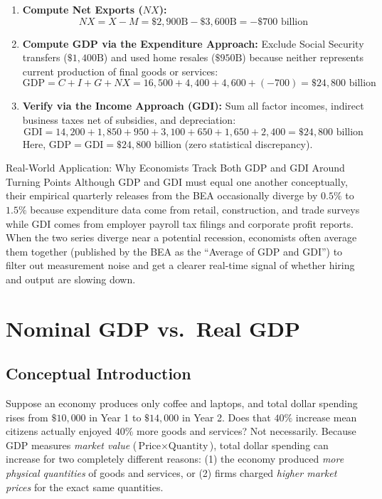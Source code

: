 \documentclass[11pt,letterpaper]{article}
\begin{document}
\begin{enumerate}
    \item \textbf{Compute Net Exports ($NX$):}
    $$NX = X - M = \$2{,}900\text{B} - \$3{,}600\text{B} = -\$700\text{ billion}$$
    \item \textbf{Compute GDP via the Expenditure Approach:}
    Exclude Social Security transfers ($\$1{,}400\text{B}$) and used home resales ($\$950\text{B}$) because neither represents current production of final goods or services:
    $$\text{GDP} = C + I + G + NX = 16{,}500 + 4{,}400 + 4{,}600 + (-700) = \$24{,}800\text{ billion}$$
    \item \textbf{Verify via the Income Approach (GDI):}
    Sum all factor incomes, indirect business taxes net of subsidies, and depreciation:
    $$\text{GDI} = 14{,}200 + 1{,}850 + 950 + 3{,}100 + 650 + 1{,}650 + 2{,}400 = \$24{,}800\text{ billion}$$
    Here, $\text{GDP} = \text{GDI} = \$24{,}800\text{ billion}$ (zero statistical discrepancy).
\end{enumerate}

\begin{examplecase}{Real-World Application: Why Economists Track Both GDP and GDI Around Turning Points}
Although GDP and GDI must equal one another conceptually, their empirical quarterly releases from the BEA occasionally diverge by $0.5\%$ to $1.5\%$ because expenditure data come from retail, construction, and trade surveys while GDI comes from employer payroll tax filings and corporate profit reports. When the two series diverge near a potential recession, economists often average them together (published by the BEA as the ``Average of GDP and GDI'') to filter out measurement noise and get a clearer real-time signal of whether hiring and output are slowing down.
\end{examplecase}

\section{Nominal GDP vs.\ Real GDP}

\subsection*{Conceptual Introduction}
Suppose an economy produces only coffee and laptops, and total dollar spending rises from $\$10{,}000$ in Year 1 to $\$14{,}000$ in Year 2. Does that $40\%$ increase mean citizens actually enjoyed $40\%$ more goods and services? Not necessarily. Because GDP measures \emph{market value} ($\text{Price} \times \text{Quantity}$), total dollar spending can increase for two completely different reasons: (1) the economy produced \emph{more physical quantities} of goods and services, or (2) firms charged \emph{higher market prices} for the exact same quantities.
\end{document}
